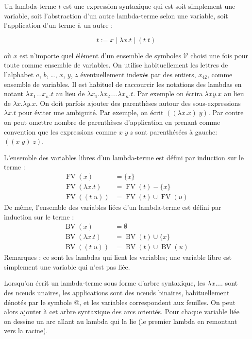 \documentclass[11pt, a4paper]{article}
\begin{document}
\begin{multicols}{2}

Un lambda-terme \(t\) est une expression syntaxique qui est soit
simplement une variable, soit l'abstraction d'un autre lambda-terme
selon une variable, soit l'application d'un terme à un autre :

\[
  t := x \mid \lambda x. t \mid (t\; t)
\]

\noindent où \(x\) est n'importe quel élément d'un ensemble de symboles
\(\mathcal{V}\) choisi une fois pour toute comme ensemble de variables.
On utilise habituellement les lettres de l'alphabet \(a\), \(b\), \ldots,
\(x\), \(y\), \(z\) éventuellement indexés par des entiers, \(x_{42}\), comme
ensemble de variables. Il est habituel de raccourcir les notations des
lambdas en notant \(\lambda x_1\ldots x_n. t\) au lieu de \(\lambda
x_1.\lambda x_2.\ldots \lambda x_n. t\). Par exemple on écrira \(\lambda
xy. x\) au lieu de \(\lambda x.\lambda y. x\). On doit parfois ajouter
des parenthèses autour des sous-expressions \(\lambda x. t\) pour éviter
une ambiguité. Par exemple, on écrit \(((\lambda x. x)\; y)\). Par
contre on peut omettre nombre de parenthèses d'application en prenant
comme convention que les expressions comme \(x\; y\; z\) sont
parenthésées à gauche: \(((x\; y)\; z)\).

L'ensemble des variables libres d'un lambda-terme est défini par
induction sur le terme :
\newcommand{\FV}[1]{\ensuremath{\operatorname{FV}(#1)}}
  \begin{align*}
    \FV x &= \{x\}\\
    \FV{\lambda x. t} &= \FV{t} - \{x\}\\
    \FV{(t\; u)} &= \FV{t} \cup \FV{u}
  \end{align*}
De même, l'ensemble des variables liées d'un lambda-terme est défini
par induction sur le terme :
\newcommand{\BV}[1]{\ensuremath{\operatorname{BV}(#1)}}
  \begin{align*}
    \BV x &= \emptyset \\
    \BV{\lambda x. t} &= \BV{t} \cup \{x\}\\
    \BV{(t\; u)} &= \BV{t} \cup \BV{u}
 \end{align*}
Remarques : ce sont les lambdas qui lient les variables; une variable
libre est simplement une variable qui n'est pas liée.


Lorsqu'on écrit un lambda-terme sous forme d'arbre syntaxique, les
\(\lambda x. \dots\) sont des nœuds unaires, les applications sont des nœuds
binaires, habituellement dénotés par le symbole @, et les variables
correspondent aux feuilles. On peut alors ajouter à cet arbre
syntaxique des arcs orientés. Pour chaque variable liée on dessine un
arc allant au lambda qui la lie (le premier lambda en remontant vers la racine).


\end{multicols}
\end{document}
